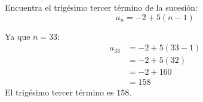 Encuentra el trigésimo tercer término de la sucesión:
\[a_n=-2+5(n-1)\]

\begin{solutionbox}{4.5cm}
    Ya que $n=33$:
    \begin{align*}
        a_{33} & =-2+5(33-1) \\
               & =-2+5(32)   \\
               & =-2+160     \\
               & =158
    \end{align*}
    El trigésimo tercer término es $158$.
\end{solutionbox}
